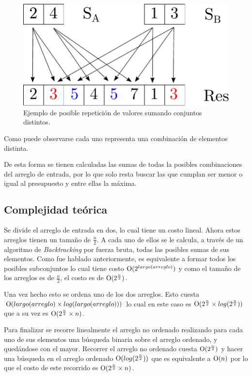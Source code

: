 \begin{figure}[H]
	\centering
	\includegraphics[scale=0.6]{imagenes/ex1_example2.pdf}
	\caption{Ejemplo de posible repetición de valores sumando conjuntos
	distintos.}
	\label{ej1:fig:value_repetition}
\end{figure}


Como puede observarse cada uno representa una combinación de elementos
distinta.

De esta forma se tienen calculadas las sumas de todas la posibles combinaciones
del arreglo de entrada, por lo que solo resta buscar las que cumplan ser menor o
igual al presupuesto y entre ellas la máxima.


\subsection{Complejidad teórica}

Se divide el arreglo de entrada en dos, lo cual tiene un costo lineal. Ahora
estos arreglos tienen un tamaño de $\frac{n}{2}$. A cada uno de ellos se le
calcula, a través de un algoritmo de \textit{Backtracking} por fuerza bruta,
todas las posibles sumas de sus elementos. Como fue hablado anteriormente, es
equivalente a formar todos los posibles subconjuntos lo cual tiene costo
$\operatorname{O}(2^{largo(arreglo)})$  y como el tamaño de los arreglos es de
$\frac{n}{2}$, el costo es de $\operatorname{O}(2^{\frac{n}{2}})$.

Una vez hecho esto se ordena uno de los dos arreglos. Esto cuesta
$\operatorname{O}(largo(arreglo) \times log(largo(arreglo)))$ lo cual en este caso es
$\operatorname{O}(2^{\frac{n}{2}} \times log(2^{\frac{n}{2}}))$ que a su vez es
$\operatorname{O}(2^{\frac{n}{2}} \times n)$.

Para finalizar se recorre linealmente el arreglo no ordenado realizando para
cada uno de sus elementos una búsqueda binaria sobre el arreglo ordenado, y
quedándose con el mayor. Recorrer el arreglo no ordenado cuesta
$\operatorname{O}(2^{\frac{n}{2}})$ y hacer una búsqueda en el arreglo ordenado
$\operatorname{O}(log(2^{\frac{n}{2}}))$ que es equivalente a $\operatorname{O}(n)$ por lo que el costo
de este recorrido es $\operatorname{O}(2^{\frac{n}{2}} \times n)$.

